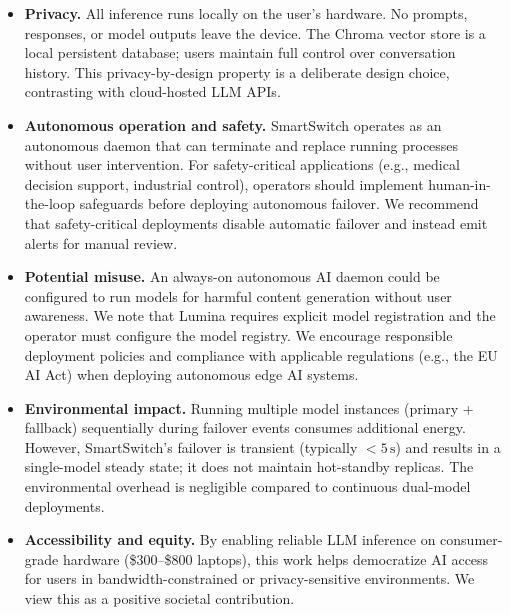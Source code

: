 \documentclass[11pt,a4paper]{article}
\newcommand{\su}{\,\mathrm{s}}
\begin{document}
\begin{itemize}[leftmargin=*]
  \item \textbf{Privacy.} All inference runs locally on the user's hardware. No prompts, responses, or model outputs leave the device. The Chroma vector store is a local persistent database; users maintain full control over conversation history. This privacy-by-design property is a deliberate design choice, contrasting with cloud-hosted LLM APIs.
  \item \textbf{Autonomous operation and safety.} SmartSwitch operates as an autonomous daemon that can terminate and replace running processes without user intervention. For safety-critical applications (e.g., medical decision support, industrial control), operators should implement human-in-the-loop safeguards before deploying autonomous failover. We recommend that safety-critical deployments disable automatic failover and instead emit alerts for manual review.
  \item \textbf{Potential misuse.} An always-on autonomous AI daemon could be configured to run models for harmful content generation without user awareness. We note that Lumina requires explicit model registration and the operator must configure the model registry. We encourage responsible deployment policies and compliance with applicable regulations (e.g., the EU AI Act) when deploying autonomous edge AI systems.
  \item \textbf{Environmental impact.} Running multiple model instances (primary + fallback) sequentially during failover events consumes additional energy. However, SmartSwitch's failover is transient (typically $<5\su$) and results in a single-model steady state; it does not maintain hot-standby replicas. The environmental overhead is negligible compared to continuous dual-model deployments.
  \item \textbf{Accessibility and equity.} By enabling reliable LLM inference on consumer-grade hardware (\$300--\$800 laptops), this work helps democratize AI access for users in bandwidth-constrained or privacy-sensitive environments. We view this as a positive societal contribution.
\end{itemize}

\end{document}
